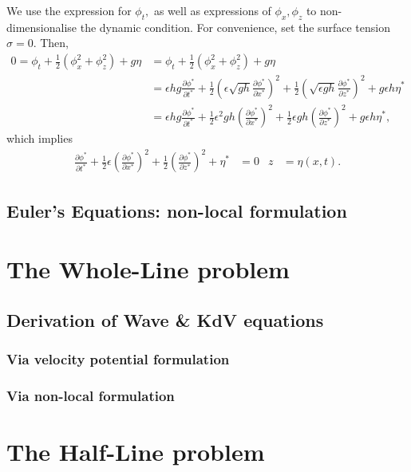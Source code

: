 \documentclass[10pt,reqno,oneside,a4paper]{article}
\begin{document}
We use the expression for $\phi_t,$ as well as expressions of $\phi_x, \phi_z$ to non-dimensionalise the dynamic condition. For convenience, set the surface tension $\sigma =0.$ Then,
\begin{align*}
0 = \phi_t + \frac{1}{2} (\phi_x^2 + \phi_z^2) + g\eta &=  \phi_t + \frac{1}{2} (\phi_x^2 + \phi_z^2) + g\eta \\
&= \epsilon h g \frac{\partial \phi^*}{\partial t^*} + \frac{1}{2} \left( \epsilon\sqrt{g h} \frac{\partial \phi^*}{\partial x^*}\right)^2 +  \frac{1}{2}\left(\sqrt{\epsilon g h} \frac{\partial \phi^*}{\partial z^*}\right)^2 + g \epsilon h \eta^* \\
&= \epsilon h g \frac{\partial \phi^*}{\partial t^*} + \frac{1}{2}  \epsilon^2 g h \left(\frac{\partial \phi^*}{\partial x^*}\right)^2 +  \frac{1}{2} \epsilon g h \left(\frac{\partial \phi^*}{\partial z^*}\right)^2 + g \epsilon h \eta^*,
\end{align*}
which implies 
\begin{align*}
\frac{\partial \phi^*}{\partial t^*} + \frac{1}{2}  \epsilon \left(\frac{\partial \phi^*}{\partial x^*}\right)^2 +  \frac{1}{2} \left(\frac{\partial \phi^*}{\partial z^*}\right)^2 + \eta^*  &= 0 &z &= \eta(x, t).
\end{align*}

\subsection{Euler's Equations: non-local formulation}

\section{The Whole-Line problem}

\subsection{Derivation of Wave \& KdV equations}

\subsubsection{Via velocity potential formulation}

\subsubsection{Via non-local formulation}

\section{The Half-Line problem}
\end{document}
